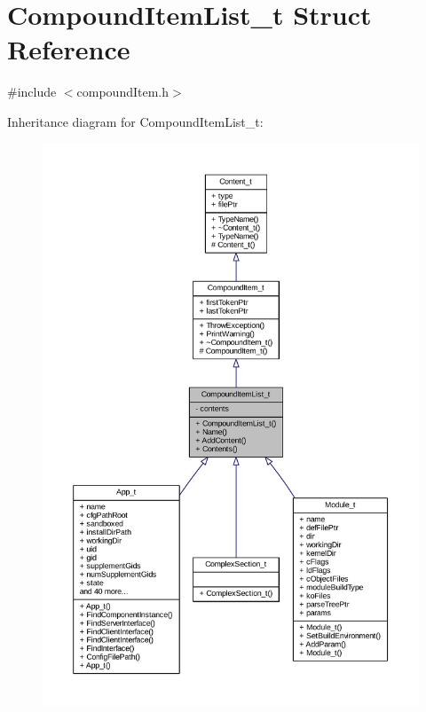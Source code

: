 \hypertarget{struct_compound_item_list__t}{}\section{Compound\+Item\+List\+\_\+t Struct Reference}
\label{struct_compound_item_list__t}


{\ttfamily \#include $<$compound\+Item.\+h$>$}



Inheritance diagram for Compound\+Item\+List\+\_\+t\+:
\nopagebreak
\begin{figure}[H]
\begin{center}
\leavevmode
\includegraphics[width=350pt]{struct_compound_item_list__t__inherit__graph}
\end{center}
\end{figure}


